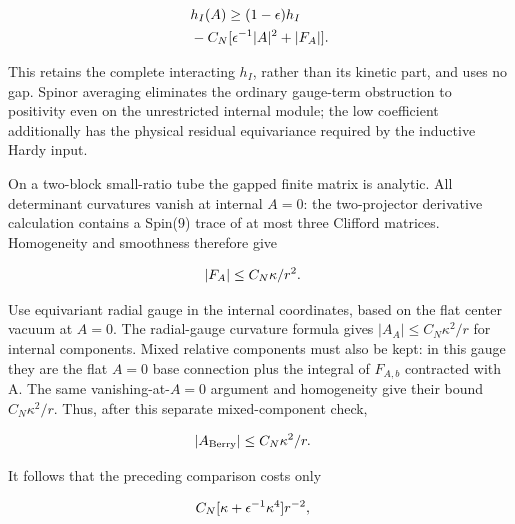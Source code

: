 \begin{gather*}
\begin{aligned}
& h_{I}(A) \ge  (1-\epsilon ) h_{I} \\
& -C_{N}[\epsilon ^{-1}\vert A\vert ^{2}+\vert F_{A}\vert ].
\end{aligned}\notag
\end{gather*}

This retains the complete interacting \(h_{I}\), rather than its kinetic
part, and uses no gap. Spinor averaging eliminates the ordinary
gauge-term obstruction to positivity even on the unrestricted internal
module; the low coefficient additionally has the physical residual
equivariance required by the inductive Hardy input.

On a two-block small-ratio tube the gapped finite matrix is analytic.
All determinant curvatures vanish at internal \(A=0\): the two-projector
derivative calculation contains a Spin(9) trace of at most three
Clifford matrices. Homogeneity and smoothness therefore give

\begin{gather*}
\begin{aligned}
& \vert F_{A}\vert  \le  C_{N} \kappa /r^{2}.
\end{aligned}\notag
\end{gather*}

Use equivariant radial gauge in the internal coordinates, based on the
flat center vacuum at \(A=0\). The radial-gauge curvature formula gives
\(\vert A_{A}\vert \le C_{N} \kappa ^{2}/r\) for internal components.
Mixed relative components must also be kept: in this gauge they are the
flat \(A=0\) base connection plus the integral of \(F_{A,b}\) contracted
with A. The same vanishing-at-\(A=0\) argument and homogeneity give
their bound \(C_{N} \kappa ^{2}/r\). Thus, after this separate
mixed-component check,

\begin{gather*}
\begin{aligned}
& \vert A_{\mathrm{Berry}}\vert  \le  C_{N} \kappa ^{2}/r.
\end{aligned}\notag
\end{gather*}

It follows that the preceding comparison costs only

\begin{gather*}
\begin{aligned}
& C_{N}[\kappa +\epsilon ^{-1} \kappa ^{4}] r^{-2},
\end{aligned}\notag
\end{gather*}

